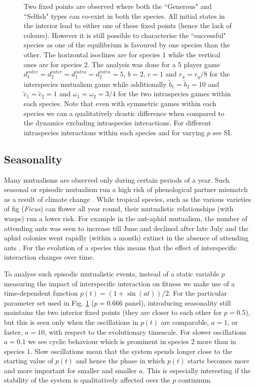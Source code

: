 \documentclass[12pt]{article}
\begin{document}
\begin{figure}
\begin{center}
{{Two fixed points are observed where both the ``Generous" and ``Selfish" types can co-exist in both the species.
All initial states in the interior lead to either one of these fixed points (hence the lack of colours).
However it is still possible to characterise the ``successful" species as one of the equilibrium is favoured by one species than the other.
The horizontal isoclines are for species $1$ while the vertical ones are for species $2$.
The analysis was done for a 5 player game $d_1^{inter} = d_2^{inter} = d_1^{intra} = d_2^{intra} = 5$, $b=2$, $c=1$ and $r_x = r_y /8$ for the interspecies mutualism game while additionally $\tilde{b}_1 = \tilde{b}_2 = 10$ and $\tilde{c}_1 = \tilde{c}_2 = 1$ and $\omega_1 = \omega_2 = 3/4$ for the two intraspecies games within each species. Note that even with symmetric games within each species we can a qualitatively drastic difference when compared to the dynamics excluding intraspecies interactions.  For different intraspecies interactions within each species and for varying $p$ see SI.}
\label{fig:mainexampleone}
}
\end{center}
\end{figure}

\subsection{Seasonality}

Many mutualisms are observed only during certain periods of a year.
Such seasonal or episodic mutualism run a high risk of phenological partner mismatch as a result of climate change \citep{rafferty:Oikos:2015}.
While tropical species, such as the various varieties of fig (\textit{Ficus}) can flower all year round, their mutualistic relationships (with wasps) run a lower risk.
For example in the ant-aphid mutualism, the number of attending ants was seen to increase till June and declined after late July and the aphid colonies went rapidly (within a month) extinct in the absence of attending ants \citep{yao:Oikos:2000,yao:JIS:2009}.
For the evolution of a species this means that the effect of interspecific interaction changes over time.

To analyse such episodic mutualistic events, instead of a static variable $p$ measuring the impact of interspecific interaction on fitness we make use of a time-dependent function $p(t) = (1 + \sin(a t))/2 $.
For the particular parameter set used in Fig. \ref{fig:mainexampleone} ($p=0.666$ panel), introducing seasonality still maintains the two interior fixed points (they are closer to each other for $p = 0.5$), but this is seen only when the oscillations in $p(t)$  are comparable, $a=1$, or faster, $a=10$, with respect to the evolutionary timescale.
For slower oscillations $a=0.1$ we see cyclic behaviour which is prominent in species $2$ more than in species $1$.
Slow oscillations mean that the system spends longer close to the starting value of $p(t)$ and hence the phase in which $p(t)$ starts becomes more and more important for smaller and smaller $a$. 
This is especially interesting if the stability of the system is qualitatively affected over the $p$ continuum.
\end{document}
